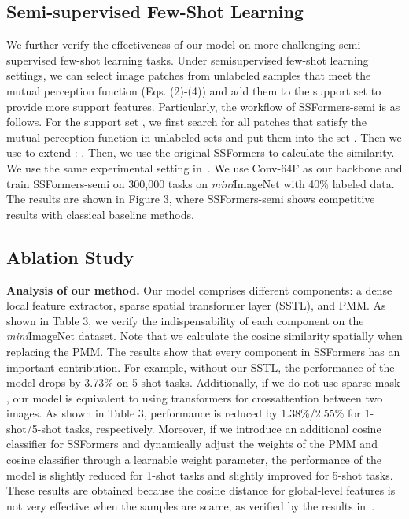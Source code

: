 \documentclass{SCIS2019}
\begin{document}
\subsection{Semi-supervised Few-Shot Learning}
We further verify the effectiveness of our model on more challenging semi-supervised few-shot learning tasks.
Under semisupervised few-shot learning settings, we can select image patches from unlabeled samples that meet the mutual perception function (Eqs. (2)-(4)) and add them to the support set to provide more support features. Particularly, the workflow of SSFormers-semi is as follows. For the support set , we first search for all patches that satisfy the mutual perception function in unlabeled sets and put them into the set . Then we use  to extend :
. Then, we use the original SSFormers to calculate the similarity.
\label{key}
We use the same experimental setting in~\cite{32}. We use Conv-64F as our backbone and train SSFormers-semi on 300,000 tasks on \emph{mini}ImageNet with 40\% labeled data. The results are shown in Figure 3, where SSFormers-semi shows competitive results with classical baseline methods.

\subsection{Ablation Study}
\textbf{Analysis of our method.}
Our model comprises different components: a dense local feature extractor, sparse spatial transformer layer (SSTL), and PMM. As shown in Table 3, we verify the indispensability of each component on the \emph{mini}ImageNet dataset. Note that we calculate the cosine similarity spatially when replacing the PMM. The results show that every component in SSFormers has an important contribution. For example, without our SSTL, the performance of the model drops by 3.73\% on 5-shot tasks. Additionally, if we do not use sparse mask , our model is equivalent to using transformers for crossattention between two images. As shown in Table 3, performance is reduced by 1.38\%/2.55\% for 1-shot/5-shot tasks, respectively. Moreover, if we introduce an additional cosine classifier for SSFormers and dynamically adjust the weights of the PMM and cosine classifier through a learnable weight parameter, the performance of the model is slightly reduced for 1-shot tasks and slightly improved for 5-shot tasks. These results are obtained because the cosine distance for global-level features is not very effective when the samples are scarce, as verified by the results in~\cite{7,44}.
\end{document}
